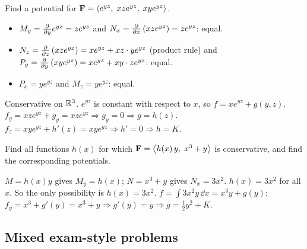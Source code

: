 \begin{problem}\label{q:pot3c}
Find a potential for $\mathbf{F}=\left\langle e^{yz},\;xze^{yz},\;xye^{yz} \right\rangle$.
\end{problem}
\begin{solution}
\begin{itemize}
\item $M_y=\frac{\partial }{\partial y}e^{yz}=ze^{yz}$ and $N_x=\frac{\partial }{\partial x}\left(xze^{yz}\right)=ze^{yz}$: equal.
\item $N_z=\frac{\partial }{\partial z}\left(xze^{yz}\right)=xe^{yz}+xz\cdot ye^{yz}$ (product rule) and
      $P_y=\frac{\partial }{\partial y}\left(xye^{yz}\right)=xe^{yz}+xy\cdot ze^{yz}$: equal.
\item $P_x=ye^{yz}$ and $M_z=ye^{yz}$: equal.
\end{itemize}
Conservative on $\mathbb{R}^3$.
 $e^{yz}$ is constant with respect to $x$, so $f=xe^{yz}+g(y,z)$.
 $f_y=xze^{yz}+g_y=xze^{yz}\Rightarrow g_y=0\Rightarrow g=h(z)$.
 $f_z=xye^{yz}+h'(z)=xye^{yz}\Rightarrow h'=0\Rightarrow h=K$.
\end{solution}

\begin{problem}\label{q:hx}
Find all functions $h(x)$ for which $\mathbf{F}=\left\langle h(x)\,y,\;x^3+y \right\rangle$ is conservative,
and find the corresponding potentials.
\end{problem}
\begin{solution}
 $M=h(x)y$ gives $M_y=h(x)$; $N=x^3+y$ gives $N_x=3x^2$.
 $h(x)=3x^2$ for all $x$. So the only possibility is $h(x)=3x^2$.
 $f=\int3x^2y\,\dd x=x^3y+g(y)$; $f_y=x^3+g'(y)=x^3+y\Rightarrow g'(y)=y\Rightarrow g=\frac12y^2+K$.
\end{solution}

\subsection{Mixed exam-style problems}

